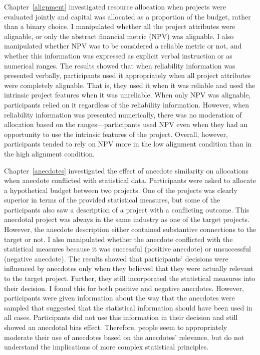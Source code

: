 \documentclass[a4paper, nobind, dvipsnames]{templates/ociamthesis}
\theoremstyle{definition}
\theoremstyle{definition}
\theoremstyle{definition}
\theoremstyle{definition}
\theoremstyle{remark}
\begin{document}
Chapter~\ref{alignment} investigated resource allocation when projects were
evaluated jointly and capital was allocated as a proportion of the budget,
rather than a binary choice. I manipulated whether all the project attributes
were alignable, or only the abstract financial metric (NPV) was alignable. I
also manipulated whether NPV was to be considered a reliable metric or not, and
whether this information was expressed as explicit verbal instruction or as
numerical ranges. The results showed that when reliability information was
presented verbally, participants used it appropriately when all project
attributes were completely alignable. That is, they used it when it was reliable
and used the intrinsic project features when it was unreliable. When only NPV
was alignable, participants relied on it regardless of the reliability
information. However, when reliability information was presented numerically,
there was no moderation of allocation based on the ranges---participants used
NPV even when they had an opportunity to use the intrinsic features of the
project. Overall, however, participants tended to rely on NPV more in the low
alignment condition than in the high alignment condition.

Chapter~\ref{anecdotes} investigated the effect of anecdote similarity on
allocations when anecdote conflicted with statistical data. Participants were
asked to allocate a hypothetical budget between two projects. One of the
projects was clearly superior in terms of the provided statistical measures, but
some of the participants also saw a description of a project with a conflicting
outcome. This anecdotal project was always in the same industry as one of the
target projects. However, the anecdote description either contained substantive
connections to the target or not. I also manipulated whether the anecdote
conflicted with the statistical measures because it was successful (positive
anecdote) or unsuccessful (negative anecdote). The results showed that
participants' decisions were influenced by anecdotes only when they believed
that they were actually relevant to the target project. Further, they still
incorporated the statistical measures into their decision. I found this for both
positive and negative anecdotes. However, participants were given information
about the way that the anecdotes were sampled that suggested that the
statistical information should have been used in all cases. Participants did not
use this information in their decision and still showed an anecdotal bias
effect. Therefore, people seem to appropriately moderate their use of anecdotes
based on the anecdotes' relevance, but do not understand the implications of
more complex statistical principles.
\end{document}
